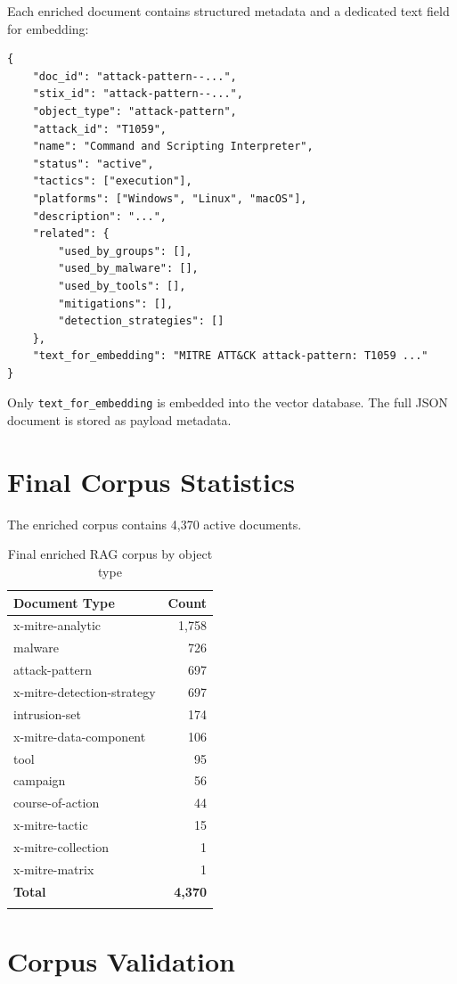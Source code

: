 \documentclass[12pt,a4paper]{report}
\begin{document}
Each enriched document contains structured metadata and a dedicated text field for embedding:

\begin{lstlisting}[style=pythonstyle]
{
    "doc_id": "attack-pattern--...",
    "stix_id": "attack-pattern--...",
    "object_type": "attack-pattern",
    "attack_id": "T1059",
    "name": "Command and Scripting Interpreter",
    "status": "active",
    "tactics": ["execution"],
    "platforms": ["Windows", "Linux", "macOS"],
    "description": "...",
    "related": {
        "used_by_groups": [],
        "used_by_malware": [],
        "used_by_tools": [],
        "mitigations": [],
        "detection_strategies": []
    },
    "text_for_embedding": "MITRE ATT&CK attack-pattern: T1059 ..."
}
\end{lstlisting}

Only \texttt{text\_for\_embedding} is embedded into the vector database. The full JSON document is stored as payload metadata.

\section{Final Corpus Statistics}

The enriched corpus contains 4,370 active documents.

\begin{longtable}{lr}
\toprule
\textbf{Document Type} & \textbf{Count} \\
\midrule
\endhead
x-mitre-analytic & 1,758 \\
malware & 726 \\
attack-pattern & 697 \\
x-mitre-detection-strategy & 697 \\
intrusion-set & 174 \\
x-mitre-data-component & 106 \\
tool & 95 \\
campaign & 56 \\
course-of-action & 44 \\
x-mitre-tactic & 15 \\
x-mitre-collection & 1 \\
x-mitre-matrix & 1 \\
\textbf{Total} & \textbf{4,370} \\
\bottomrule
\caption{Final enriched RAG corpus by object type}
\end{longtable}

\section{Corpus Validation}
\end{document}
